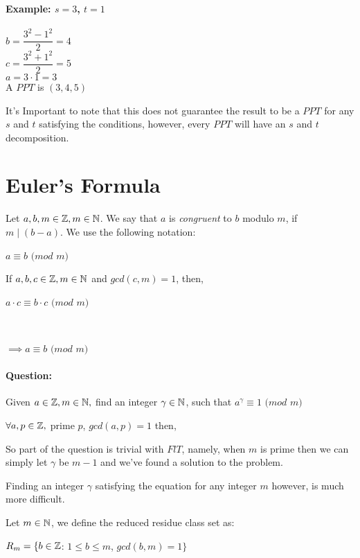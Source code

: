 \documentclass[main.tex]{subfiles}
\begin{document}
\paragraph{Example: $s = 3$, $t = 1$}
\begin{center}
    $b=\dfrac{3^2-1^2}{2} = 4$ \\
    $c=\dfrac{3^2+1^2}{2} = 5$ \\
    $a=3 \cdot 1 = 3$ \\
    A $PPT$ is $(3, 4, 5)$
\end{center}
It's Important to note that this does not guarantee the result to be a $PPT$ for any $s$ and $t$ satisfying the conditions, however, every $PPT$ will have an $s$ and $t$ decomposition.

\section{Euler's Formula}
\begin{defn}[Congruence]
    Let $a,b,m \in \mathbb{Z}, m \in \mathbb{N}$. We say that $a$ is \textit{congruent} to $b$ modulo $m$, if $m \mid (b-a)$. We use the following notation: \\
    \centerline{$a \equiv b$  $(mod$ $m)$}
\end{defn}
\begin{thm}
    If $a,b,c \in \mathbb{Z}, m \in \mathbb{N}$ and $gcd(c,m)=1$, then, \\
    \centerline{$a \cdot c \equiv b \cdot c$ $(mod$ $ m)$} \\
    \centerline{$\implies a \equiv b$ $(mod$ $ m)$}
\end{thm}
\paragraph{Question:}
Given $a \in \mathbb{Z}, m \in \mathbb{N},$ find an integer $\gamma \in \mathbb{N}$, such that $a^\gamma \equiv 1$ $(mod$ $m)$
\begin{thm}
    $\forall a, p \in \mathbb{Z},$ prime $p$, $gcd(a,p)=1$ then, \\
    \centerline{}
\end{thm}
So part of the question is trivial with $FlT$, namely, when $m$ is prime then we can simply let $\gamma$ be $m-1$ and we've found a solution to the problem.

Finding an integer $\gamma$ satisfying the equation for any integer $m$ however, is much more difficult.
\begin{defn}
    Let $m \in \mathbb{N}$, we define the reduced residue class set as: \\
    \centerline{$R_m = \{b \in \mathbb{Z}$: $1 \leq b \leq m$, $gcd(b,m)=1\}$}
\end{defn}
\end{document}
